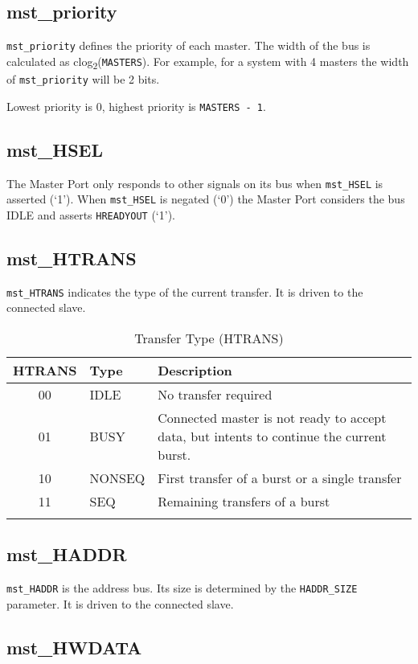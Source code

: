 \subsection{mst\_priority}\label{mst_priority}

\texttt{mst\_priority} defines the priority of each master. The width of the bus is calculated as clog\textsubscript{2}(\texttt{MASTERS}). For example, for a system with 4 masters the width of \texttt{mst\_priority} will be 2 bits.

Lowest priority is 0, highest priority is \texttt{MASTERS - 1}.

\subsection{mst\_HSEL}\label{mst_hsel}

The Master Port only responds to other signals on its bus when \texttt{mst\_HSEL} is
asserted (`1'). When \texttt{mst\_HSEL} is negated (`0') the Master Port
considers the bus IDLE and asserts \texttt{HREADYOUT} (`1').

\subsection{mst\_HTRANS}\label{mst_htrans}

\texttt{mst\_HTRANS} indicates the type of the current transfer. It is driven to
the connected slave.

\begin{longtable}[]{@{}clp{9cm}@{}}
\toprule
HTRANS & Type & Description\tabularnewline
\midrule
\endhead
00 & IDLE & No transfer required\tabularnewline
01 & BUSY & Connected master is not ready to accept data, but intents to
continue the current burst.\tabularnewline
10 & NONSEQ & First transfer of a burst or a single
transfer\tabularnewline
11 & SEQ & Remaining transfers of a burst\tabularnewline
\bottomrule
\caption{Transfer Type (HTRANS)}
\end{longtable}


\subsection{mst\_HADDR}\label{mst_haddr}

\texttt{mst\_HADDR} is the address bus. Its size is determined by the \texttt{HADDR\_SIZE}
parameter. It is driven to the connected slave.

\subsection{mst\_HWDATA}\label{mst_hwdata}


